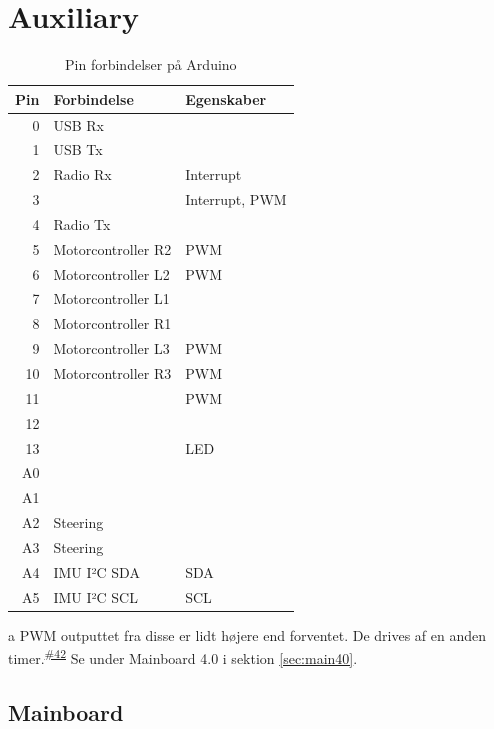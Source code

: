 \documentclass[a4paper,twoside,article,danish,table]{memoir}
\newcommand{\issue}[1]{\textsuperscript{\textcolor{blue!80!black}{\href{https://github.com/neic/Swagway/issues/#1}{\##1}}}}
\begin{document}
\chapter{Auxiliary}
\begin{table}[htbp]
  \caption{Pin forbindelser på Arduino}
  \centering
  \begin{threeparttable}
    \begin{tabular}{rll}
      \toprule
      Pin & Forbindelse & Egenskaber\\
      \midrule
      0 & USB Rx & \\
      1 & USB Tx & \\
      2 & Radio Rx & Interrupt\\
      3 & & Interrupt, PWM\\
      4 & Radio Tx & \\
      5 & Motorcontroller R2 & PWM\tnote{a}\\
      6 & Motorcontroller L2 & PWM\tnote{a}\\
      7 & Motorcontroller L1 & \\
      8 & Motorcontroller R1 & \\
      9 & Motorcontroller L3 & PWM\\
      10 & Motorcontroller R3 & PWM\\
      11 & & PWM\\
      12 & & \\
      13 & & LED\\
      A0 & & \\
      A1 & & \\
      A2 & Steering & \\
      A3 & Steering & \\
      A4 & IMU I²C SDA & SDA\\
      A5 & IMU I²C SCL & SCL
    \end{tabular}
    \begin{tablenotes}
      \item[a]{PWM outputtet fra disse er lidt højere end forventet. De drives af en anden timer.\issue{42} Se under Mainboard 4.0 i sektion \ref{sec:main40}.}
    \end{tablenotes}
  \end{threeparttable}
\end{table}

\section{Mainboard}
\end{document}
